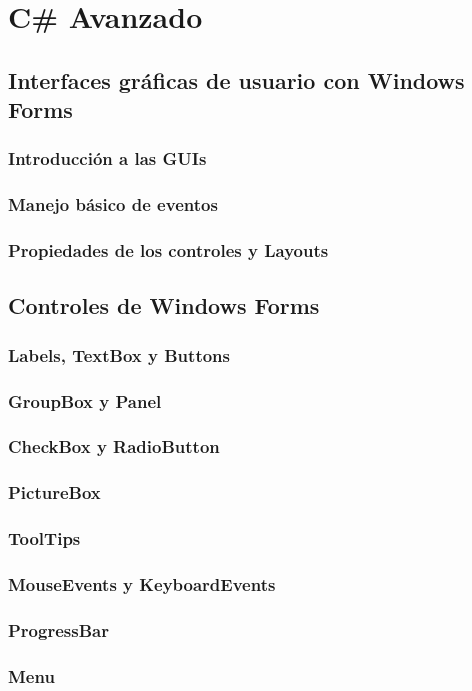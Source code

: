 \documentclass[12pt,a4paper]{report}
\begin{document}
\part{C\# Avanzado}
\chapter{ Interfaces gráficas de usuario con Windows Forms}
\section{Introducción a las GUIs}
\section{Manejo básico de eventos}
\section{Propiedades de los controles y Layouts}

\chapter{Controles de Windows Forms}
\section{Labels, TextBox y Buttons}
\section{GroupBox y Panel}
\section{CheckBox y RadioButton}
\section{PictureBox}
\section{ToolTips}
\section{MouseEvents y KeyboardEvents}
\section{ProgressBar}
\section{Menu}
\end{document}
